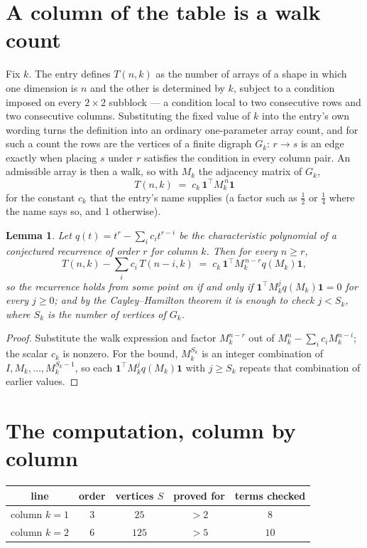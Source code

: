 \documentclass[11pt,a4paper]{article}
\theoremstyle{plain}
\newtheorem{lemma}[theorem]{Lemma}
\theoremstyle{definition}
\begin{document}
\section{A column of the table is a walk count}

Fix $k$. The entry defines $T(n,k)$ as the number of arrays of a shape in which one dimension
is $n$ and the other is determined by $k$, subject to a condition imposed on every
$2\times2$ subblock --- a condition local to two consecutive rows and two consecutive columns.
Substituting the fixed value of $k$ into the entry's own wording turns the definition into an
ordinary one-parameter array count, and for such a count the rows are the vertices of a finite
digraph $G_k$: $r\to s$ is an edge exactly when placing $s$ under $r$ satisfies the condition
in every column pair. An admissible array is then a walk, so with $M_k$ the adjacency matrix
of $G_k$,
\[
T(n,k)\;=\;c_k\,\mathbf{1}^{\!\top}M_k^{\,n}\mathbf{1}
\]
for the constant $c_k$ that the entry's name supplies (a factor such as $\tfrac12$ or
$\tfrac14$ where the name says so, and $1$ otherwise).

\begin{lemma}\label{lem:crit}
Let $q(t)=t^{r}-\sum_i c_it^{r-i}$ be the characteristic polynomial of a conjectured
recurrence of order $r$ for column $k$. Then for every $n\ge r$,
\[
T(n,k)-\sum_i c_i\,T(n-i,k)\;=\;c_k\,\mathbf{1}^{\!\top}M_k^{\,n-r}q(M_k)\mathbf{1},
\]
so the recurrence holds from some point on if and only if
$\mathbf{1}^{\!\top}M_k^{j}q(M_k)\mathbf{1}=0$ for every $j\ge0$; and by the
Cayley--Hamilton theorem it is enough to check $j<S_k$, where $S_k$ is the number of vertices
of $G_k$.
\end{lemma}

\begin{proof}
Substitute the walk expression and factor $M_k^{n-r}$ out of $M_k^{n}-\sum_ic_iM_k^{n-i}$;
the scalar $c_k$ is nonzero. For the bound, $M_k^{S_k}$ is an integer combination of
$I,M_k,\dots,M_k^{S_k-1}$, so each $\mathbf{1}^{\!\top}M_k^{j}q(M_k)\mathbf{1}$ with
$j\ge S_k$ repeats that combination of earlier values.
\end{proof}

\section{The computation, column by column}

\begin{center}
\begin{tabular}{ccccc}
line & order & vertices $S$ & proved for & terms checked \\ \hline
column $k$$=1$ & $3$ & $25$ & $>2$ & $8$ \\
column $k$$=2$ & $6$ & $125$ & $>5$ & $10$ \\
\end{tabular}
\end{center}
\end{document}
